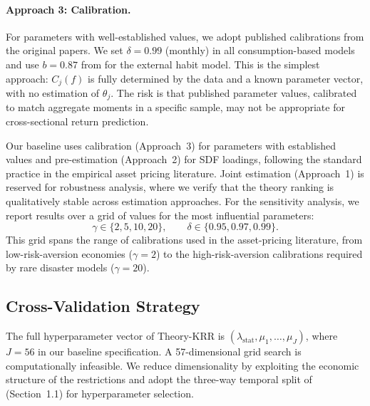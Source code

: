 \paragraph{Approach 3: Calibration.}
For parameters with well-established values, we adopt published calibrations from the original papers.
We set $\delta = 0.99$ (monthly) in all consumption-based models and use $b = 0.87$ from \citet{campbellcochrane1999} for the external habit model.
This is the simplest approach: $C_j(f)$ is fully determined by the data and a known parameter vector, with no estimation of $\theta_j$.
The risk is that published parameter values, calibrated to match aggregate moments in a specific sample, may not be appropriate for cross-sectional return prediction.

Our baseline uses calibration (Approach~3) for parameters with established values and pre-estimation (Approach~2) for SDF loadings, following the standard practice in the empirical asset pricing literature.
Joint estimation (Approach~1) is reserved for robustness analysis, where we verify that the theory ranking is qualitatively stable across estimation approaches.
For the sensitivity analysis, we report results over a grid of values for the most influential parameters:
\begin{equation}\label{eq:sensitivity_grid}
\gamma \in \{2, 5, 10, 20\}, \qquad \delta \in \{0.95, 0.97, 0.99\}.
\end{equation}
This grid spans the range of calibrations used in the asset-pricing literature, from low-risk-aversion economies ($\gamma = 2$) to the high-risk-aversion calibrations required by rare disaster models ($\gamma = 20$).

\subsection{Cross-Validation Strategy}\label{sub:cv_strategy}

The full hyperparameter vector of Theory-KRR is $(\lambda_{\mathrm{stat}}, \mu_1, \ldots, \mu_J)$, where $J = 56$ in our baseline specification.
A 57-dimensional grid search is computationally infeasible.
We reduce dimensionality by exploiting the economic structure of the restrictions and adopt the three-way temporal split of \citet{gu2020empirical} (Section~1.1) for hyperparameter selection.

